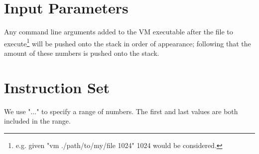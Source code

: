 \documentclass[10pt,a4paper]{article}
\begin{document}
	\section{Input Parameters}
	\label{input_parameters}
	Any command line arguments added to the VM executable after the file to execute\footnote{e.g. given "vm ./path/to/my/file 1024" 1024 would be considered.} will be pushed onto the stack in order of appearance; following that the amount of these numbers is pushed onto the stack. 	
	
	\section{Instruction Set}
	\label{instruction_set}
	We use "..." to specify a range of numbers. The first and last values are both included in the range. \\
\end{document}
